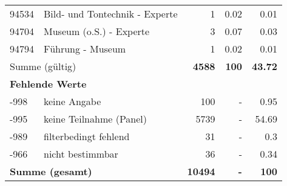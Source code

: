 \begin{longtable}{lXrrr}
        94534 & \multicolumn{1}{X}{Bild- und Tontechnik - Experte} & %
          \num{1} &
          \num[round-mode=places,round-precision=2]{0,02} &
          \num[round-mode=places,round-precision=2]{0,01} \\

        94704 & \multicolumn{1}{X}{Museum (o.S.) - Experte} & %
          \num{3} &
          \num[round-mode=places,round-precision=2]{0,07} &
          \num[round-mode=places,round-precision=2]{0,03} \\

        94794 & \multicolumn{1}{X}{Führung - Museum} & %
          \num{1} &
          \num[round-mode=places,round-precision=2]{0,02} &
          \num[round-mode=places,round-precision=2]{0,01} \\

     \midrule
     \multicolumn{2}{l}{Summe (gültig)} &
       \textbf{\num{4588}} &
     \textbf{100} &
       \textbf{\num[round-mode=places,round-precision=2]{43,72}} \\
     \multicolumn{5}{l}{\textbf{Fehlende Werte}}\\
       -998 &
       keine Angabe &
         \num{100} &
        - &
         \num[round-mode=places,round-precision=2]{0,95} \\
       -995 &
       keine Teilnahme (Panel) &
         \num{5739} &
        - &
         \num[round-mode=places,round-precision=2]{54,69} \\
       -989 &
       filterbedingt fehlend &
         \num{31} &
        - &
         \num[round-mode=places,round-precision=2]{0,3} \\
       -966 &
       nicht bestimmbar &
         \num{36} &
        - &
         \num[round-mode=places,round-precision=2]{0,34} \\
     \midrule
     \multicolumn{2}{l}{\textbf{Summe (gesamt)}} &
          \textbf{\num{10494}} &
        \textbf{-} &
        \textbf{100} \\
     \bottomrule
     \end{longtable}
     
